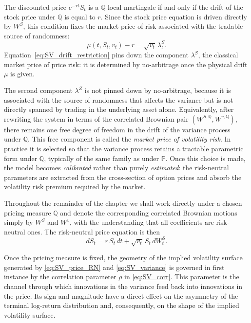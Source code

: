 The discounted price $e^{-rt}S_t$ is a $\mathbb{Q}$-local martingale if
and only if the drift of the stock price under $\mathbb{Q}$ is equal to
$r$. Since the stock price equation is driven directly by $W^{S}$, this
condition fixes the market price of risk associated with the tradable
source of randomness:
\begin{equation}\label{eq:SV_drift_restriction}
\mu(t,S_t,v_t)-r
=
\sqrt{v_t}\,\lambda^S_t.
\end{equation}
Equation~\eqref{eq:SV_drift_restriction} pins down the component
$\lambda^S$, the classical market price of price risk: it is determined
by no-arbitrage once the physical drift $\mu$ is given.

The second component $\lambda^Z$ is not pinned down by no-arbitrage,
because it is associated with the source of randomness that affects the
variance but is not directly spanned by trading in the underlying asset
alone. Equivalently, after rewriting the system in terms of the
correlated Brownian pair $(W^{S,\mathbb{Q}},W^{v,\mathbb{Q}})$, there
remains one free degree of freedom in the drift of the variance process
under $\mathbb{Q}$. This free component is called the \emph{market price
of volatility risk}. In practice it is selected so that the variance
process retains a tractable parametric form under $\mathbb{Q}$, typically
of the same family as under $\mathbb{P}$. Once this choice is made, the
model becomes \emph{calibrated} rather than purely \emph{estimated}: the
risk-neutral parameters are extracted from the cross-section of option
prices and absorb the volatility risk premium required by the market.

Throughout the remainder of the chapter we shall work directly under a
chosen pricing measure $\mathbb{Q}$ and denote the corresponding
correlated Brownian motions simply by $W^{S}$ and $W^{v}$, with the
understanding that all coefficients are risk-neutral ones. The
risk-neutral price equation is then
\begin{equation}\label{eq:SV_price_RN}
dS_t
=
r\,S_t\,dt+\sqrt{v_t}\,S_t\,dW^{S}_t.
\end{equation}

Once the pricing measure is fixed, the geometry of the implied volatility
surface generated by \eqref{eq:SV_price_RN} and
\eqref{eq:SV_variance} is governed in first instance by the correlation
parameter $\rho$ in \eqref{eq:SV_corr}. This parameter is the channel
through which innovations in the variance feed back into innovations in
the price. Its sign and magnitude have a direct effect on the asymmetry
of the terminal log-return distribution and, consequently, on the shape
of the implied volatility surface.

